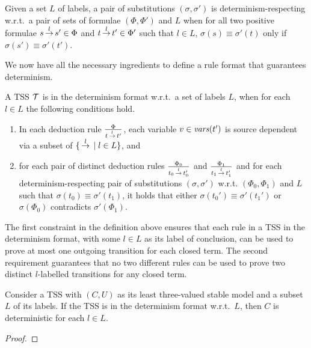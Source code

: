 \begin{definition}
Given a set $L$ of labels, a pair of substitutions $(\sigma,\sigma')$ is determinism-respecting w.r.t.\
a pair of sets of formulae $(\Phi, \Phi')$ and $L$ when for all two positive formulae $s \,{\stackrel{{l}}{\rightarrow}}\, s' \in \Phi$ and $t \,{\stackrel{{l}}{\rightarrow}}\, t' \in \Phi'$ such that $l \in L$, $\sigma(s) \equiv \sigma'(t)$ only if  $\sigma(s') \equiv \sigma'(t')$.
\end{definition}


We now have all the necessary ingredients to define a rule format that guarantees
determinism.

\begin{definition}
A TSS $\mathcal{T}$ is in the determinism format w.r.t.\ a set of labels $L$,
when for each $l \in L$ the following conditions hold.
\begin{enumerate}
    \item In each deduction rule $\frac{\Phi}{t\,{\stackrel{{l}}{\rightarrow}}\,t'}$, each variable $v\in \mathit{vars}(t')$ is source dependent
          via a subset of $\{ \,{\stackrel{{l}}{\rightarrow}}\, \mid l \in L\}$, and
    \item for each pair of distinct deduction rules $\frac{\Phi_0}{t_0\,{\stackrel{{l}}{\rightarrow}}\,t_0'}$ and $\frac{\Phi_1}{t_1\,{\stackrel{{l}}{\rightarrow}}\,t_1'}$ and
          for each determinism-respecting pair of substitutions $(\sigma, \sigma')$ w.r.t. $(\Phi_0, \Phi_1)$ and $L$
          such that $\sigma(t_0)\equiv\sigma'(t_1)$, it holds that
          either $\sigma(t_0')\equiv\sigma'(t_1')$ or $\sigma(\Phi_0)$ contradicts $\sigma'(\Phi_1)$.
\end{enumerate}
\end{definition}

The first constraint in the definition above ensures that each rule in a TSS
in the determinism format, with some $l \in L$ as its label of conclusion,
can be used to prove at most one outgoing transition for each closed term.
The second requirement guarantees that no two different rules can be used to prove two distinct
$l$-labelled transitions for any closed term.

\begin{theorem}\label{th::det}
Consider a TSS with $(C, U)$ as its least three-valued stable model and a subset $L$ of its labels. If the TSS is in the determinism format w.r.t.\ $L$, then $C$ is deterministic for each $l\in L$.
\end{theorem}
\begin{proof}

\end{proof}

